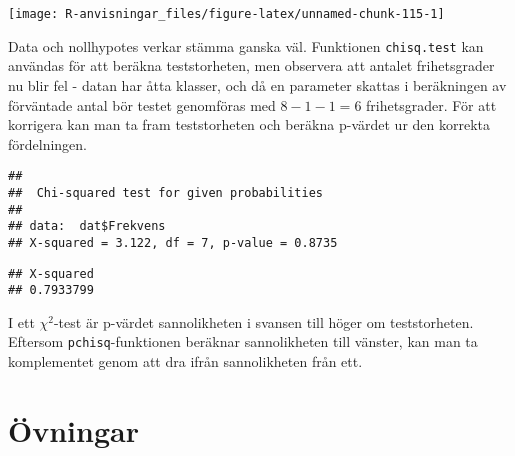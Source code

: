 \documentclass[
]{book}
\newenvironment{Shaded}{\begin{snugshade}}{\end{snugshade}}
\newcommand{\AttributeTok}[1]{\textcolor[rgb]{0.77,0.63,0.00}{#1}}
\newcommand{\DecValTok}[1]{\textcolor[rgb]{0.00,0.00,0.81}{#1}}
\newcommand{\FunctionTok}[1]{\textcolor[rgb]{0.00,0.00,0.00}{#1}}
\newcommand{\NormalTok}[1]{#1}
\newcommand{\OtherTok}[1]{\textcolor[rgb]{0.56,0.35,0.01}{#1}}
\newcommand{\SpecialCharTok}[1]{\textcolor[rgb]{0.00,0.00,0.00}{#1}}
\theoremstyle{definition}
\theoremstyle{definition}
\theoremstyle{definition}
\theoremstyle{definition}
\theoremstyle{remark}
\begin{document}
\begin{center}\texttt{[image: R-anvisningar\_files/figure-latex/unnamed-chunk-115-1]} \end{center}

Data och nollhypotes verkar stämma ganska väl. Funktionen \texttt{chisq.test} kan användas för att beräkna teststorheten, men observera att antalet frihetsgrader nu blir fel - datan har åtta klasser, och då en parameter skattas i beräkningen av förväntade antal bör testet genomföras med \(8-1-1=6\) frihetsgrader. För att korrigera kan man ta fram teststorheten och beräkna p-värdet ur den korrekta fördelningen.

\begin{Shaded}
\end{Shaded}

\begin{verbatim}
## 
##  Chi-squared test for given probabilities
## 
## data:  dat$Frekvens
## X-squared = 3.122, df = 7, p-value = 0.8735
\end{verbatim}

\begin{Shaded}
\end{Shaded}

\begin{verbatim}
## X-squared 
## 0.7933799
\end{verbatim}

I ett \(\chi^2\)-test är p-värdet sannolikheten i svansen till höger om teststorheten. Eftersom \texttt{pchisq}-funktionen beräknar sannolikheten till vänster, kan man ta komplementet genom att dra ifrån sannolikheten från ett.

\hypertarget{uxf6vningar-2}{%
\section{Övningar}\label{uxf6vningar-2}}
\end{document}
